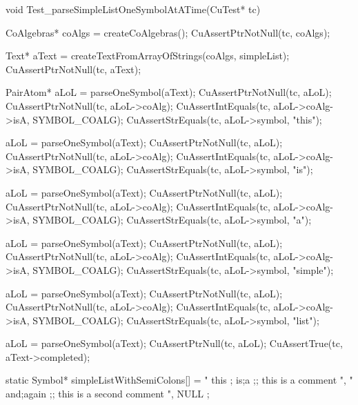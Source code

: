 void Test_parseSimpleListOneSymbolAtATime(CuTest* tc) {
  CoAlgebras* coAlgs = createCoAlgebras();
  CuAssertPtrNotNull(tc, coAlgs);

  Text* aText = createTextFromArrayOfStrings(coAlgs, simpleList);
  CuAssertPtrNotNull(tc, aText);

  PairAtom* aLoL = parseOneSymbol(aText);
  CuAssertPtrNotNull(tc, aLoL);
  CuAssertPtrNotNull(tc, aLoL->coAlg);
  CuAssertIntEquals(tc, aLoL->coAlg->isA, SYMBOL_COALG);
  CuAssertStrEquals(tc, aLoL->symbol, "this");

  aLoL = parseOneSymbol(aText);
  CuAssertPtrNotNull(tc, aLoL);
  CuAssertPtrNotNull(tc, aLoL->coAlg);
  CuAssertIntEquals(tc, aLoL->coAlg->isA, SYMBOL_COALG);
  CuAssertStrEquals(tc, aLoL->symbol, "is");

  aLoL = parseOneSymbol(aText);
  CuAssertPtrNotNull(tc, aLoL);
  CuAssertPtrNotNull(tc, aLoL->coAlg);
  CuAssertIntEquals(tc, aLoL->coAlg->isA, SYMBOL_COALG);
  CuAssertStrEquals(tc, aLoL->symbol, "a");

  aLoL = parseOneSymbol(aText);
  CuAssertPtrNotNull(tc, aLoL);
  CuAssertPtrNotNull(tc, aLoL->coAlg);
  CuAssertIntEquals(tc, aLoL->coAlg->isA, SYMBOL_COALG);
  CuAssertStrEquals(tc, aLoL->symbol, "simple");

  aLoL = parseOneSymbol(aText);
  CuAssertPtrNotNull(tc, aLoL);
  CuAssertPtrNotNull(tc, aLoL->coAlg);
  CuAssertIntEquals(tc, aLoL->coAlg->isA, SYMBOL_COALG);
  CuAssertStrEquals(tc, aLoL->symbol, "list");

  aLoL = parseOneSymbol(aText);
  CuAssertPtrNull(tc, aLoL);
  CuAssertTrue(tc, aText->completed);
}

static Symbol* simpleListWithSemiColons[] = {
  " this ; is;a ;; this is a comment ",
  " and;again ;; this is a second comment ",
  NULL
};

